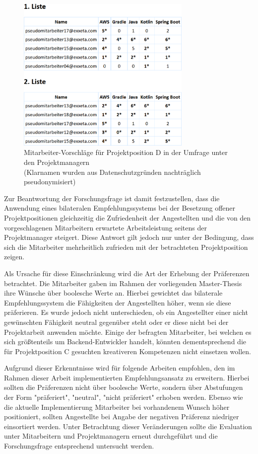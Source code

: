 \begin{figure}[h]
	\centering
	\includegraphics[width=0.75\textwidth]{gfx/projektposition-d.png}
	\caption{Mitarbeiter-Vorschläge für Projektposition D in der Umfrage unter den Projektmanagern\\
	(Klarnamen wurden aus Datenschutzgründen nachträglich pseudonymisiert)}
	\label{fig:diskussion:interpretation:abb2}
\end{figure}

Zur Beantwortung der Forschungsfrage ist damit festzustellen, dass die Anwendung eines bilateralen Empfehlungssystems bei der Besetzung offener Projektpositionen gleichzeitig die Zufriedenheit der Angestellten und die von den vorgeschlagenen Mitarbeitern erwartete Arbeitsleistung seitens der Projektmanager steigert. Diese Antwort gilt jedoch nur unter der Bedingung, dass sich die Mitarbeiter mehrheitlich zufrieden mit der betrachteten Projektposition zeigen.

Als Ursache für diese Einschränkung wird die Art der Erhebung der Präferenzen betrachtet. Die Mitarbeiter gaben im Rahmen der vorliegenden Master-Thesis ihre Wünsche über boolesche Werte an. Hierbei gewichtet das bilaterale Empfehlungssystem die Fähigkeiten der Angestellten höher, wenn sie diese präferieren. Es wurde jedoch nicht unterschieden, ob ein Angestellter einer nicht gewünschten Fähigkeit neutral gegenüber steht oder er diese nicht bei der Projektarbeit anwenden möchte. Einige der befragten Mitarbeiter, bei welchen es sich größtenteils um Backend-Entwickler handelt, könnten dementsprechend die für Projektposition C gesuchten kreativeren Kompetenzen nicht einsetzen wollen.

Aufgrund dieser Erkenntnisse wird für folgende Arbeiten empfohlen, den im Rahmen dieser Arbeit implementierten Empfehlungsansatz zu erweitern. Hierbei sollten die Präferenzen nicht über boolesche Werte, sondern über Abstufungen der Form "präferiert", "neutral", "nicht präferiert" erhoben werden. Ebenso wie die aktuelle Implementierung Mitarbeiter bei vorhandenem Wunsch höher positioniert, sollten Angestellte bei Angabe der negativen Präferenz niedriger einsortiert werden. Unter Betrachtung dieser Veränderungen sollte die Evaluation unter Mitarbeitern und Projektmanagern erneut durchgeführt und die Forschungsfrage entsprechend untersucht werden.

